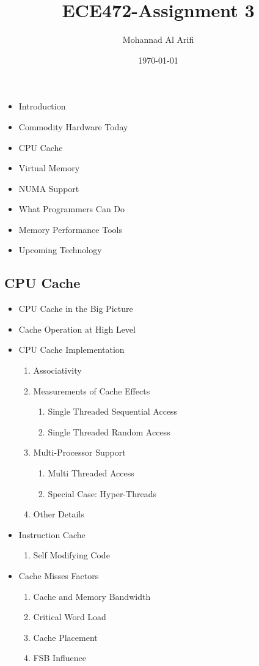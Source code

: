 \documentclass[a4paper]{article}
\title{ECE472-Assignment 3}
\author{Mohannad Al Arifi}
\date{\today}
\begin{document}
\maketitle

\begin{itemize}
   \item Introduction
   \item Commodity Hardware Today
   \item CPU Cache
   \item Virtual Memory
   \item NUMA Support
   \item What Programmers Can Do
   \item Memory Performance Tools
   \item Upcoming Technology
\end{itemize}


\subsection{CPU Cache}
\begin{itemize}
   \item CPU Cache in the Big Picture
   \item Cache Operation at High Level
   \item CPU Cache Implementation
      \begin{enumerate}
	 \item Associativity 
	 \item Measurements of Cache Effects 
	    \begin{enumerate}
	       \item Single Threaded Sequential Access 
	       \item Single Threaded Random Access
	    \end{enumerate}
	 \item Multi-Processor Support
	    \begin{enumerate}
	       \item Multi Threaded Access
	       \item Special Case: Hyper-Threads
	    \end{enumerate}
	 \item Other Details
      \end{enumerate}
   \item Instruction Cache 
      \begin{enumerate}
	 \item Self Modifying Code 
      \end{enumerate}
   \item Cache Misses Factors
      \begin{enumerate}
	 \item Cache and Memory Bandwidth
	 \item Critical Word Load
	 \item Cache Placement
	 \item FSB Influence
      \end{enumerate}
\end{itemize}
\end{document}
